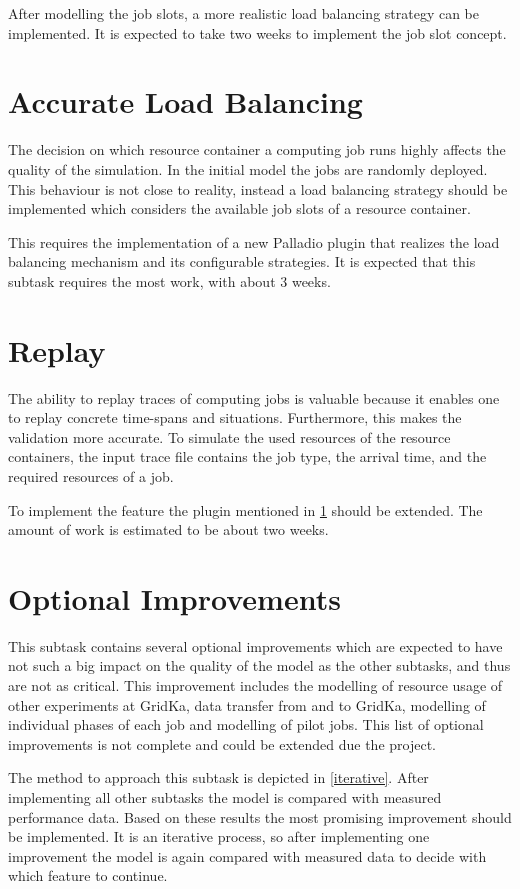 After modelling the job slots, a more realistic load balancing strategy can be implemented. It is expected to take two weeks to implement the job slot concept. 
\clearpage
\section{Accurate Load Balancing}
\label{scheduling}
The decision on which resource container a computing job runs highly affects the quality of the simulation. In the initial model the jobs are randomly deployed. This behaviour is not close to reality, instead a load balancing strategy should be implemented which considers the available job slots of a resource container. 

This requires the implementation of a new Palladio plugin that realizes the load balancing mechanism and its configurable strategies.
It is expected that this subtask requires the most work, with about 3 weeks.

\section{Replay}
The ability to replay traces of computing jobs is valuable because it enables one to replay concrete time-spans and situations. Furthermore, this makes the validation more accurate. To simulate the used resources of the resource containers, the input trace file contains the job type, the arrival time, and the required resources of a job.

To implement the feature the plugin mentioned in \cref{scheduling} should be extended. The amount of work is estimated to be about two weeks.

\section{Optional Improvements}
This subtask contains several optional improvements which are expected to have not such a big impact on the quality of the model as the other subtasks, and thus are not as critical. This improvement includes the modelling of resource usage of other experiments at GridKa, data transfer from and to GridKa, modelling of individual phases of each job and modelling of pilot jobs.
This list of optional improvements is not complete and could be extended due the project.

The method to approach this subtask is depicted in \cref{iterative}. After implementing all other subtasks the model is compared with measured performance data. Based on these results the most promising improvement should be implemented. It is an iterative process, so after implementing one improvement the model is again compared with measured data to decide with which feature to continue.

